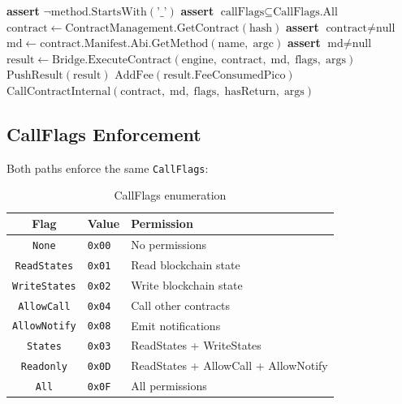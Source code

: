 \documentclass[11pt,a4paper]{article}
\begin{document}
\begin{algorithm}[H]
\caption{CallContract}
\label{alg:call}
\begin{algorithmic}[1]
\State \textbf{assert} $\neg\text{method.StartsWith}(\texttt{'\_'})$
\State \textbf{assert} $\text{callFlags} \subseteq \text{CallFlags.All}$
\State $\text{contract} \gets \text{ContractManagement.GetContract}(\text{hash})$
\State \textbf{assert} $\text{contract} \neq \text{null}$
\State $\text{md} \gets \text{contract.Manifest.Abi.GetMethod}(\text{name},\; \text{argc})$
\State \textbf{assert} $\text{md} \neq \text{null}$
    \State $\text{result} \gets \text{Bridge.ExecuteContract}(
        \text{engine},\; \text{contract},\; \text{md},\; \text{flags},\; \text{args})$
    \State $\text{PushResult}(\text{result})$
    \State $\text{AddFee}(\text{result.FeeConsumedPico})$
\Else
    \State $\text{CallContractInternal}(\text{contract},\; \text{md},\; \text{flags},\; \text{hasReturn},\; \text{args})$
\EndIf
\end{algorithmic}
\end{algorithm}

\subsection{CallFlags Enforcement}

Both paths enforce the same \texttt{CallFlags}:

\begin{table}[H]
\centering
\begin{tabular}{clp{6cm}}
\toprule
\textbf{Flag} & \textbf{Value} & \textbf{Permission} \\
\midrule
\texttt{None}              & \texttt{0x00} & No permissions \\
\texttt{ReadStates}        & \texttt{0x01} & Read blockchain state \\
\texttt{WriteStates}       & \texttt{0x02} & Write blockchain state \\
\texttt{AllowCall}         & \texttt{0x04} & Call other contracts \\
\texttt{AllowNotify}       & \texttt{0x08} & Emit notifications \\
\texttt{States}            & \texttt{0x03} & ReadStates + WriteStates \\
\texttt{Readonly}          & \texttt{0x0D} & ReadStates + AllowCall + AllowNotify \\
\texttt{All}               & \texttt{0x0F} & All permissions \\
\bottomrule
\end{tabular}
\caption{CallFlags enumeration}
\label{tab:callflags}
\end{table}
\end{document}
